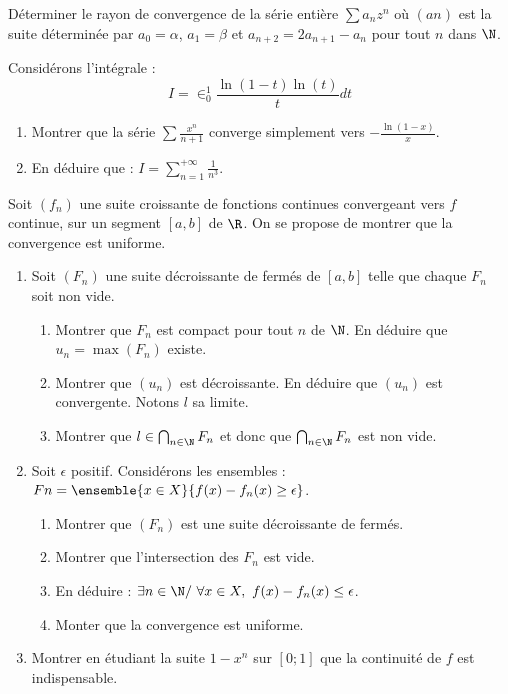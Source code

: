 \documentclass[french,11pt,twoside]{VcCours}
\begin{document}
\begin{Exercice}
  Déterminer le rayon de convergence de la série entière $\sum a_nz^n$ où $(an)$ 
  est la suite déterminée par $a_0 = \alpha$, $a_1 = \beta$ et
  $a_{n+2} = 2a_{n+1}-a_n$ pour tout $n$ dans $\N$.
\end{Exercice}


\begin{Exercice}
  Considérons l'intégrale :
  \[I=\in_0^1\frac{\ln(1-t)\ln(t)}{t}dt\]
  \begin{enumerate}
    \item Montrer que la série $\sum\frac{x^n}{n+1}$ converge simplement vers $-\frac{\ln(1-x)}{x}$.
    \item En déduire que : $I=\sum_{n=1}^{+\infty}\frac{1}{n^3}$.
\end{enumerate}
\end{Exercice}


\begin{Exercice}
  Soit $(f_n)$ une suite croissante de fonctions continues convergeant vers $f$ continue, sur un segment $[a,b]$ de $\R$. 
  On se propose de montrer que la convergence est uniforme.
  \begin{enumerate}
    \item Soit $(F_n)$ une suite décroissante de fermés de $[a,b]$ telle que chaque $F_n$ soit non vide.
    \begin{enumerate}
      \item Montrer que $F_n$ est compact pour tout $n$ de $\N$. En déduire que $u_n = \max(F_n)$ existe.
      \item Montrer que $(u_n)$ est décroissante. En déduire que $(u_n)$ est convergente. 
      Notons $l$ sa limite.
      \item Montrer que $l\in\bigcap_{n\in\N}F_n$ et donc que $\bigcap_{n\in\N}F_n$ est non vide.
\end{enumerate}
\item Soit $\epsilon$ positif. Considérons les ensembles : $Fn = \ensemble{x\in X}{f(x)-f_n(x) \geq \epsilon}$.
  \begin{enumerate}
    \item Montrer que $(F_n)$ est une suite décroissante de fermés.
  \item Montrer que l'intersection des $F_n$ est vide.
  \item En déduire : $\exists n\in\N/\ \forall x\in X,\ f(x)-f_n(x) \leq \epsilon$.
  \item Monter que la convergence est uniforme.
\end{enumerate}
\item Montrer en étudiant la suite $1-x^n$ sur $[0;1]$ que la continuité de $f$ est indispensable.
\end{enumerate}
\end{Exercice}
\end{document}
